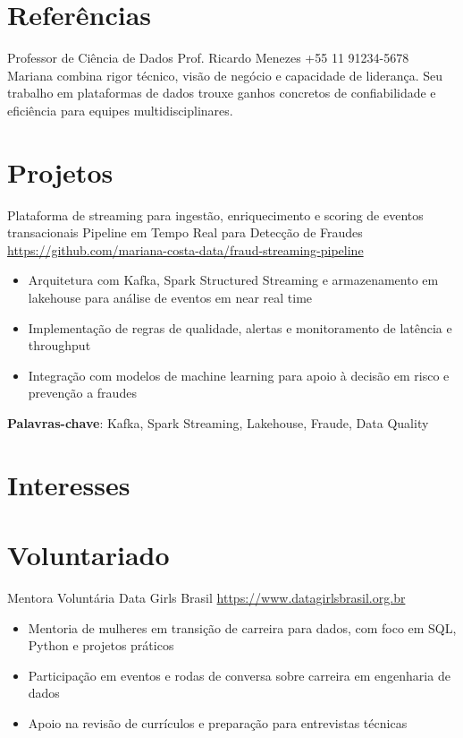 \documentclass[a4paper, serif, 10pt]{moderncv}
\begin{document}
\section{Referências}

        {Professor de Ciência de Dados}
        {Prof. Ricardo Menezes}
        {+55 11 91234-5678}
        {}
        {Mariana combina rigor técnico, visão de negócio e capacidade de liderança. Seu trabalho em plataformas de dados trouxe ganhos concretos de confiabilidade e eficiência para equipes multidisciplinares.}
\section{Projetos}

        {Plataforma de streaming para ingestão, enriquecimento e scoring de eventos transacionais}
        {Pipeline em Tempo Real para Detecção de Fraudes}
        {\url{https://github.com/mariana-costa-data/fraud-streaming-pipeline}}
        {}
        {\begin{itemize}
\item Arquitetura com Kafka, Spark Structured Streaming e armazenamento em lakehouse para análise de eventos em near real time
\item Implementação de regras de qualidade, alertas e monitoramento de latência e throughput
\item Integração com modelos de machine learning para apoio à decisão em risco e prevenção a fraudes
\end{itemize}
\textbf{Palavras-chave}: Kafka, Spark Streaming, Lakehouse, Fraude, Data Quality}
\section{Interesses}

\section{Voluntariado}

        {Mentora Voluntária}
        {Data Girls Brasil}
        {\url{https://www.datagirlsbrasil.org.br}}
        {}
        {\begin{itemize}
\item Mentoria de mulheres em transição de carreira para dados, com foco em SQL, Python e projetos práticos
\item Participação em eventos e rodas de conversa sobre carreira em engenharia de dados
\item Apoio na revisão de currículos e preparação para entrevistas técnicas
\end{itemize}}
    
\end{document}
